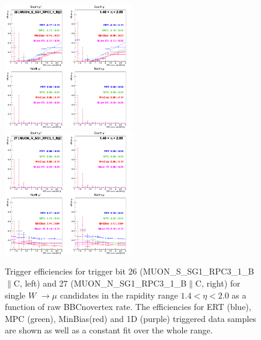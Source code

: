 \begin{figure}[ht]
\begin{center}
\includegraphics[width=0.5\textwidth]{./figures/run13_trigeffirate_eta1_trig26_lin.png}
\includegraphics[width=0.5\textwidth]{./figures/run13_trigeffirate_eta1_trig27_lin.png}
\caption{\label{fig:run13_trigeffirate_trig2627} Trigger efficiencies for trigger bit 26 (MUON\_S\_SG1\_RPC3\_1\_B$\|$C, left) and 27 (MUON\_N\_SG1\_RPC3\_1\_B$\|$C, right) for single $W$ $\rightarrow \mu$ candidates in the rapidity range $ 1.4 < \eta < 2.0$ as a function of raw BBCnovertex rate. The efficiencies for ERT (blue), MPC (green), MinBias(red) and 1D (purple) triggered data samples are shown as well as a constant fit over the whole range.}
\end{center}
\end{figure}

